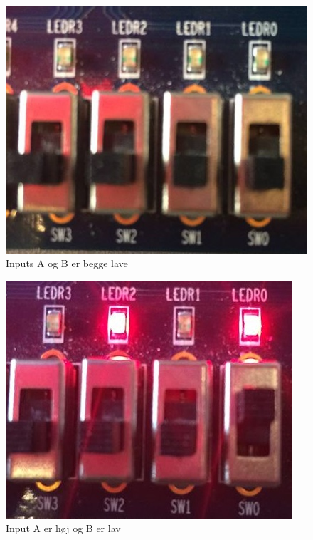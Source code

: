 \begin{enumerate}
	\begin{figure}[h]
		\centering
		\includegraphics[scale=0.2]{pictures/Oevelse8/opg1/Function0_0}
		\caption{Inputs A og B er begge lave}
		\label{fig:figur0_0}
	\end{figure}

	\begin{figure}[h]
		\centering
		\includegraphics[scale=0.2]{pictures/Oevelse8/opg1/Function0_1}
		\caption{Input A er høj og B er lav}
		\label{fig:figur0_1}
	\end{figure}


\end{enumerate}
